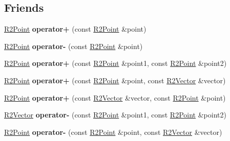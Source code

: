 \subsection*{Friends}
\begin{DoxyCompactItemize}
\item 
\hyperlink{class_r2_point}{R2\+Point} {\bfseries operator+} (const \hyperlink{class_r2_point}{R2\+Point} \&point)\hypertarget{class_r2_point_a7e954ed86aa83b18a2ac4e5305f40352}{}\label{class_r2_point_a7e954ed86aa83b18a2ac4e5305f40352}

\item 
\hyperlink{class_r2_point}{R2\+Point} {\bfseries operator-\/} (const \hyperlink{class_r2_point}{R2\+Point} \&point)\hypertarget{class_r2_point_a8c84d3aba58422180333a862b9015408}{}\label{class_r2_point_a8c84d3aba58422180333a862b9015408}

\item 
\hyperlink{class_r2_point}{R2\+Point} {\bfseries operator+} (const \hyperlink{class_r2_point}{R2\+Point} \&point1, const \hyperlink{class_r2_point}{R2\+Point} \&point2)\hypertarget{class_r2_point_a143d276e6f9ce0006590615dc8393d6e}{}\label{class_r2_point_a143d276e6f9ce0006590615dc8393d6e}

\item 
\hyperlink{class_r2_point}{R2\+Point} {\bfseries operator+} (const \hyperlink{class_r2_point}{R2\+Point} \&point, const \hyperlink{class_r2_vector}{R2\+Vector} \&vector)\hypertarget{class_r2_point_a5993a9d2da50b3f4228015b3772e326e}{}\label{class_r2_point_a5993a9d2da50b3f4228015b3772e326e}

\item 
\hyperlink{class_r2_point}{R2\+Point} {\bfseries operator+} (const \hyperlink{class_r2_vector}{R2\+Vector} \&vector, const \hyperlink{class_r2_point}{R2\+Point} \&point)\hypertarget{class_r2_point_a79c114ff3c2d214f9f5ae36adea012cb}{}\label{class_r2_point_a79c114ff3c2d214f9f5ae36adea012cb}

\item 
\hyperlink{class_r2_vector}{R2\+Vector} {\bfseries operator-\/} (const \hyperlink{class_r2_point}{R2\+Point} \&point1, const \hyperlink{class_r2_point}{R2\+Point} \&point2)\hypertarget{class_r2_point_a962f6a879be0ac7edf7f734908bef87d}{}\label{class_r2_point_a962f6a879be0ac7edf7f734908bef87d}

\item 
\hyperlink{class_r2_point}{R2\+Point} {\bfseries operator-\/} (const \hyperlink{class_r2_point}{R2\+Point} \&point, const \hyperlink{class_r2_vector}{R2\+Vector} \&vector)\hypertarget{class_r2_point_abc88a48322ee6c0d6453128360a7f623}{}\label{class_r2_point_abc88a48322ee6c0d6453128360a7f623}


\end{DoxyCompactItemize}
